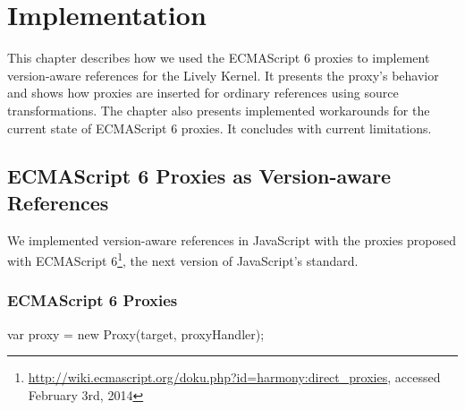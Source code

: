 

\chapter{Implementation} \label{chapter:IMPLEMENTATION}

This chapter describes how we used the ECMAScript 6 proxies to implement version-aware references for the Lively Kernel.
It presents the proxy's behavior and shows how proxies are inserted for ordinary references using source transformations.
The chapter also presents implemented workarounds for the current state of ECMAScript 6 proxies.
It concludes with current limitations.


\section{ECMAScript 6 Proxies as Version-aware References} \label{sec:IMPLEMENTATION:1}

We implemented version-aware references in JavaScript with the proxies proposed with ECMAScript 6\footnote{\url{http://wiki.ecmascript.org/doku.php?id=harmony:direct_proxies}, accessed February 3rd, 2014}, the next version of JavaScript's standard.

\subsection{ECMAScript 6 Proxies}

    
    
    

\begin{code}{}{}
var proxy = new Proxy(target, proxyHandler);
\end{code}
\label{lst:example}
\iffalse
\end{verbatim}\fi

